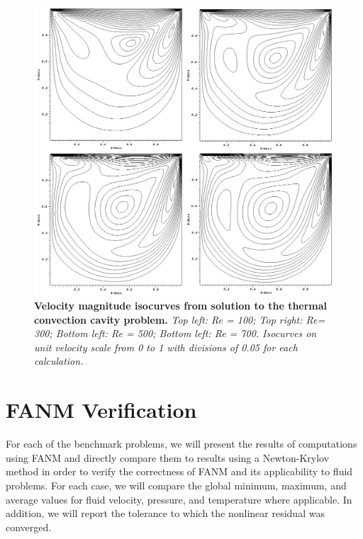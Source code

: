 \begin{figure}[t!]
  \begin{center}
    \includegraphics[width=6in]{chapters/nonlinear_problem/driven_velocity_isocurves.png}
  \end{center}
  \caption{\textbf{Velocity magnitude isocurves from solution to the
      thermal convection cavity problem.} \textit{Top left: Re = 100;
      Top right: Re= 300; Bottom left: Re = 500; Bottom left: Re =
      700. Isocurves on unit velocity scale from 0 to 1 with divisions
      of 0.05 for each calculation.}}
  \label{fig:driven_velocity_isocurves}
\end{figure}

\clearpage

\section{FANM Verification\ }
\label{sec:fanm_verification}

For each of the benchmark problems, we will present the results of
computations using FANM and directly compare them to results using a
Newton-Krylov method in order to verify the correctness of FANM and
its applicability to fluid problems. For each case, we will compare
the global minimum, maximum, and average values for fluid velocity,
pressure, and temperature where applicable. In addition, we will
report the tolerance to which the nonlinear residual was converged.

